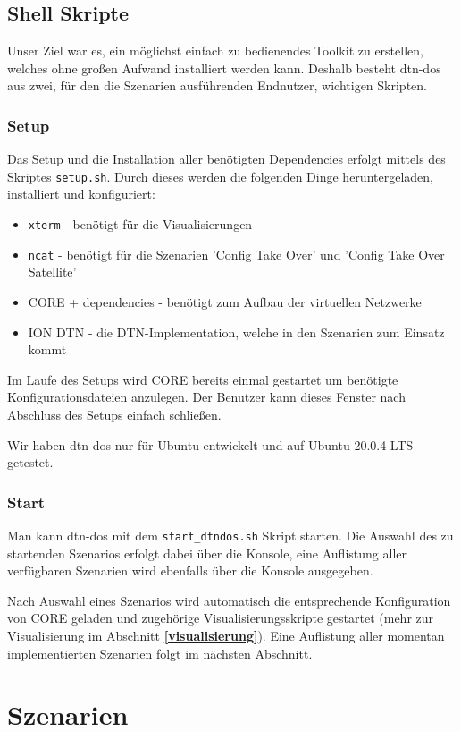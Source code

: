 \documentclass{article}
\begin{document}
\subsection{Shell Skripte}
Unser Ziel war es, ein möglichst einfach zu bedienendes Toolkit zu erstellen, welches ohne großen Aufwand installiert werden kann. Deshalb besteht dtn-dos aus zwei, für den die Szenarien ausführenden Endnutzer, wichtigen Skripten.
\subsubsection{Setup}
Das Setup und die Installation aller benötigten Dependencies erfolgt mittels des Skriptes \texttt{setup.sh}. Durch dieses werden die folgenden Dinge heruntergeladen, installiert und konfiguriert:
\begin{itemize}
    \item \texttt{xterm} - benötigt für die Visualisierungen
    \item \texttt{ncat} - benötigt für die Szenarien 'Config Take Over' und 'Config Take Over Satellite'
    \item CORE + dependencies - benötigt zum Aufbau der virtuellen Netzwerke
    \item ION DTN \cite{ion} - die DTN-Implementation, welche in den Szenarien zum Einsatz kommt
\end{itemize}
Im Laufe des Setups wird CORE bereits einmal gestartet um benötigte Konfigurationsdateien anzulegen. Der Benutzer kann dieses Fenster nach Abschluss des Setups einfach schließen.\par
Wir haben dtn-dos nur für Ubuntu entwickelt und auf Ubuntu 20.0.4 LTS getestet.
\subsubsection{Start}
Man kann dtn-dos mit dem \texttt{start\_dtndos.sh} Skript starten. Die Auswahl des zu startenden Szenarios erfolgt dabei über die Konsole, eine Auflistung aller verfügbaren Szenarien wird ebenfalls über die Konsole ausgegeben.\par
Nach Auswahl eines Szenarios wird automatisch die entsprechende Konfiguration von CORE geladen und zugehörige Visualisierungsskripte gestartet (mehr zur Visualisierung im Abschnitt \textbf{\ref{visualisierung}}). Eine Auflistung aller momentan implementierten Szenarien folgt im nächsten Abschnitt.
\newpage
\section{Szenarien}
\end{document}
